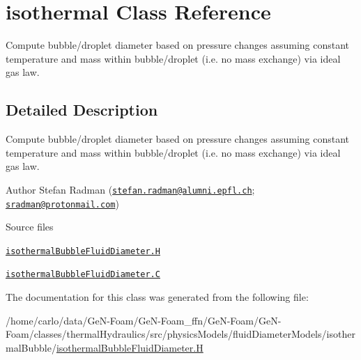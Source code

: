 \hypertarget{classFoam_1_1isothermal}{}\section{isothermal Class Reference}
\label{classFoam_1_1isothermal}


Compute bubble/droplet diameter based on pressure changes assuming constant temperature and mass within bubble/droplet (i.\+e. no mass exchange) via ideal gas law.  




\subsection{Detailed Description}
Compute bubble/droplet diameter based on pressure changes assuming constant temperature and mass within bubble/droplet (i.\+e. no mass exchange) via ideal gas law. 

\label{_Description}%
 Author Stefan Radman (\href{mailto:stefan.radman@alumni.epfl.ch}{\tt stefan.\+radman@alumni.\+epfl.\+ch}; \href{mailto:sradman@protonmail.com}{\tt sradman@protonmail.\+com})

\begin{DoxyParagraph}{Source files}

\begin{DoxyItemize}
\item \href{../../../home/carlo/data/GeN-Foam/GeN-Foam_ffn/GeN-Foam/GeN-Foam/classes/thermalHydraulics/src/physicsModels/fluidDiameterModels/isothermalBubble/isothermalBubbleFluidDiameter.H}{\tt isothermal\+Bubble\+Fluid\+Diameter.\+H} 
\item \href{../../../home/carlo/data/GeN-Foam/GeN-Foam_ffn/GeN-Foam/GeN-Foam/classes/thermalHydraulics/src/physicsModels/fluidDiameterModels/isothermalBubble/isothermalBubbleFluidDiameter.C}{\tt isothermal\+Bubble\+Fluid\+Diameter.\+C} 
\end{DoxyItemize}
\end{DoxyParagraph}


The documentation for this class was generated from the following file\+:\begin{DoxyCompactItemize}
\item 
/home/carlo/data/\+Ge\+N-\/\+Foam/\+Ge\+N-\/\+Foam\+\_\+ffn/\+Ge\+N-\/\+Foam/\+Ge\+N-\/\+Foam/classes/thermal\+Hydraulics/src/physics\+Models/fluid\+Diameter\+Models/isothermal\+Bubble/\hyperlink{isothermalBubbleFluidDiameter_8H}{isothermal\+Bubble\+Fluid\+Diameter.\+H}\end{DoxyCompactItemize}
